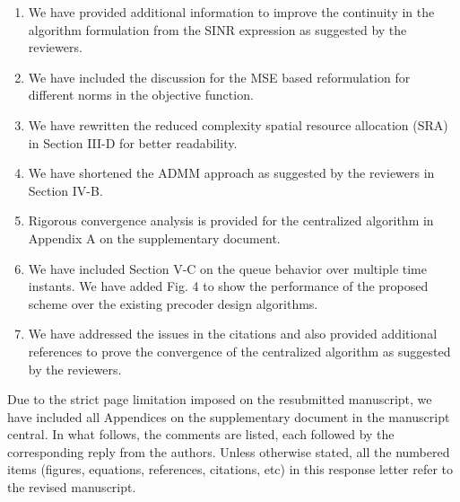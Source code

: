 \begin{enumerate}
\item We have provided additional information to improve the continuity in the algorithm formulation from the SINR expression as suggested by the reviewers.
\item We have included the discussion for the MSE based reformulation for different norms in the objective function.
\item We have rewritten the reduced complexity spatial resource allocation (SRA) in Section III-D for better readability.
\item We have shortened the ADMM approach as suggested by the reviewers in Section IV-B.
\item Rigorous convergence analysis is provided for the centralized algorithm in Appendix A on the supplementary document. 
\item We have included Section V-C on the queue behavior over multiple time instants. We have added Fig. 4 to show the performance of the proposed scheme over the existing precoder design algorithms.
\item We have addressed the issues in the citations and also provided additional references to prove the convergence of the centralized algorithm as suggested by the reviewers.
\end{enumerate}

Due to the strict page limitation imposed on the resubmitted manuscript, we have included all Appendices on the supplementary document in the manuscript central. In what follows, the comments are listed, each followed by the corresponding reply from the authors. Unless otherwise stated, all the numbered items (figures, equations, references, citations, etc) in this response letter refer to the revised manuscript.